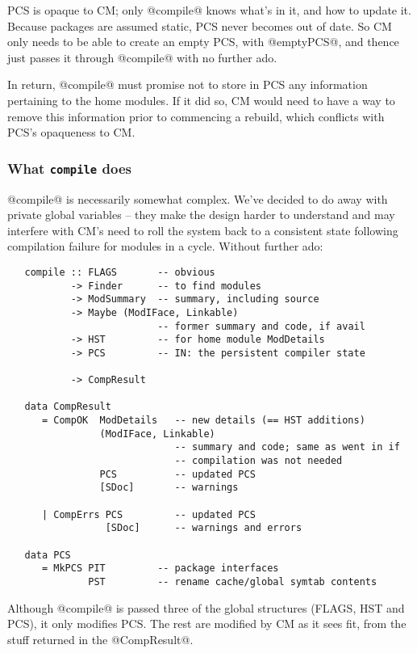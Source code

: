 \documentclass[11pt]{article}
\begin{document}
   PCS is opaque to CM; only @compile@ knows what's in it, and how to
   update it.  Because packages are assumed static, PCS never becomes
   out of date.  So CM only needs to be able to create an empty PCS,
   with @emptyPCS@, and thence just passes it through @compile@ with
   no further ado.

   In return, @compile@ must promise not to store in PCS any
   information pertaining to the home modules.  If it did so, CM would
   need to have a way to remove this information prior to commencing a
   rebuild, which conflicts with PCS's opaqueness to CM.




\subsubsection*{What {\tt compile} does}
@compile@ is necessarily somewhat complex.  We've decided to do away
with private global variables -- they make the design harder to
understand and may interfere with CM's need to roll the system back
to a consistent state following compilation failure for modules in 
a cycle.  Without further ado:
\begin{verbatim}
   compile :: FLAGS       -- obvious
           -> Finder      -- to find modules
           -> ModSummary  -- summary, including source
           -> Maybe (ModIFace, Linkable)
                          -- former summary and code, if avail
           -> HST         -- for home module ModDetails
           -> PCS         -- IN: the persistent compiler state

           -> CompResult

   data CompResult
      = CompOK  ModDetails   -- new details (== HST additions)
                (ModIFace, Linkable)
                             -- summary and code; same as went in if
                             -- compilation was not needed
                PCS          -- updated PCS
                [SDoc]       -- warnings

      | CompErrs PCS         -- updated PCS
                 [SDoc]      -- warnings and errors

   data PCS
      = MkPCS PIT         -- package interfaces
              PST         -- rename cache/global symtab contents
\end{verbatim}
Although @compile@ is passed three of the global structures (FLAGS,
HST and PCS), it only modifies PCS.  The rest are modified by CM as it
sees fit, from the stuff returned in the @CompResult@.
\end{document}
